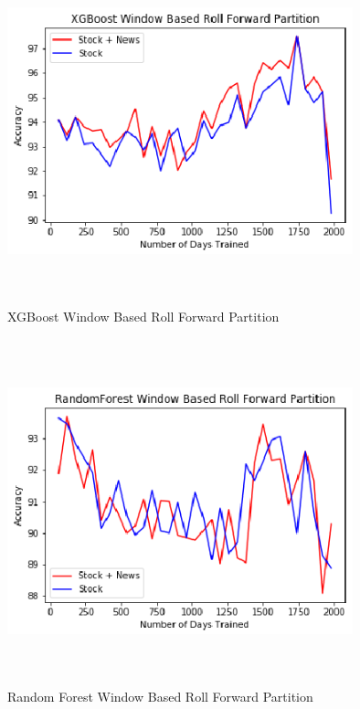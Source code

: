 \documentclass[preprint,12pt]{elsarticle}
\begin{document}
\begin{figure}[H]
\centering
\includegraphics[width=10cm,height=10cm,keepaspectratio]{XGBoost_Window_Training_Acc.eps}
\caption{\label{fig:XGBoost_window_training} XGBoost Window Based Roll Forward Partition}
\end{figure}

\begin{figure}[H]
\centering
\includegraphics[width=10cm,height=10cm,keepaspectratio]{RandomForest_Window_Training_Acc.eps}
\caption{\label{fig:RandomForest_window_training} Random Forest Window Based Roll Forward Partition}
\end{figure}
\end{document}
